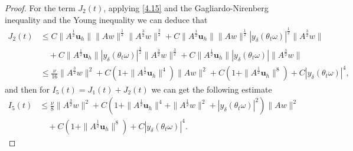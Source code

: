 \documentclass{elsarticle}
\theoremstyle{definition}
\numberwithin{equation}{section}
\begin{document}
\begin{proof}
For   the term $J_2(t)$, applying \eqref{4.15} and the Gagliardo-Nirenberg inequality and the Young inequality we can deduce that
\begin{align}
J_2(t)
&\leq C\|A^{\frac12}\textbf{u}_h\|\|Aw\|^\frac12\|A^{\frac32}w\|^\frac 32 +C\|A^{\frac12}\textbf{u}_h\|\|Aw\|^\frac12|y_\delta(\theta_t\omega)|^\frac12\|A^\frac32w\|
 \nonumber\\
&\quad+C\|A^{\frac12}\textbf{u}_h\| |y_\delta(\theta_t\omega)|^\frac12\|A^{\frac32}w\|^\frac 32
+C\|A^{\frac12}\textbf{u}_h\| |y_\delta(\theta_t\omega)|  \|A^\frac32w\|\nonumber\\
&\leq \frac \nu {16}\|A^\frac32w\|^2+C\left (1+\|A^\frac12\textbf{u}_h\|^4\right )\|Aw\|^2+C\left (1+\|A^\frac12\textbf{u}_h\|^8 \right)  +C |y_\delta(\theta_t\omega)|^4, \nonumber
\end{align}
and then  for $I_{5} (t)=J_1(t)+ J_2(t)$ we can get the following estimate
\begin{align}
I_{5}(t) &\leq  \frac \nu 8\|A^\frac32w\|^2
+C\left(1+ \|A^\frac12\textbf{u}_h\|^4+\|A^\frac12w\|^2+ |y_\delta(\theta_t\omega)|^2 \right)
\|Aw\|^2 \nonumber  \\
&\quad +C\left(1+\|A^\frac12\textbf{u}_h\|^8 \right)
+C  |y_\delta(\theta_t\omega)|^4. \label{sep6.2}
\end{align}



\end{proof}
\end{document}
